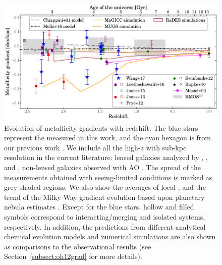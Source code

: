 \begin{figure}
    \centering
    \includegraphics[width=\textwidth]{fig/oh12gradVSz.pdf}
    \caption[Evolution of metallicity gradients with redshift.]
    {Evolution of metallicity gradients with redshift. The blue stars represent
    the \mgs measured in this work, and the cyan hexagon is from our previous work
    \citep{2015AJ....149..107J}. We include all the high-$z$ \mgms
    with sub-kpc resolution in the current literature: lensed galaxies analyzed by
    \citet{Frye:2012dr}, \citet{2013ApJ...765...48J}, and \citet{2015arXiv150901279L}, non-lensed
    galaxies observed with AO \citep{2012MNRAS.426..935S}.
    The spread of the \kd measurements obtained with seeing-limited conditions \citep{2016ApJ...827...74W} is marked as grey 
    shaded regions.
    We also show the averages of local \mgs \citep{Rupke:2010cg}, and the trend of the Milky Way gradient evolution based upon 
    planetary nebula estimates \citep{Maciel:2003kv}.
    Except for the blue stars, hollow and filled symbols correspond to interacting/merging
    and isolated systems, respectively.
    In addition, the predictions from different analytical chemical evolution models and
    numerical simulations are also shown as comparisons to the observational results (see
    Section~\ref{subsect:oh12grad} for more details).}
    \label{fig:oh12gradVSz}
\end{figure}

